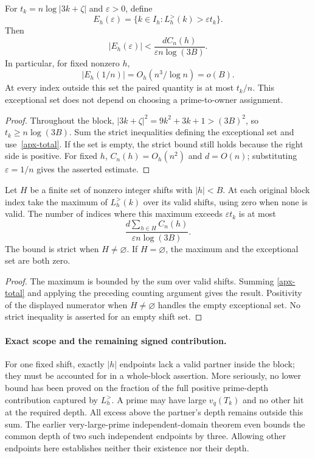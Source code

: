 \begin{corollary}
\label{apx-exceptional}
For \(t_k=n\log|3k+\zeta|\) and \(\varepsilon>0\), define
\[
 E_h(\varepsilon)=\{k\in I_h:L_h^{>}(k)>\varepsilon t_k\}.
\]
Then
\begin{equation}
 |E_h(\varepsilon)|<
       \frac{dC_n(h)}{\varepsilon n\log(3B)}.
 \label{apx-markov}
\end{equation}
In particular, for fixed nonzero \(h\),
\[
 |E_h(1/n)|=O_h(n^3/\log n)=o(B).
\]
At every index outside this set the paired quantity is at most
\(t_k/n\). This exceptional set does not depend on choosing a
prime-to-owner assignment.
\end{corollary}
\begin{proof}
Throughout the block,
\(|3k+\zeta|^2=9k^2+3k+1>(3B)^2\), so
\(t_k\ge n\log(3B)\). Sum the strict inequalities defining the
exceptional set and use~\eqref{apx-total}. If the set is empty,
the strict bound still holds because the right side is positive.
For fixed \(h\), \(C_n(h)=O_h(n^2)\) and \(d=O(n)\);
substituting \(\varepsilon=1/n\) gives the asserted estimate.
\end{proof}

\begin{corollary}
\label{apx-finite-shifts}
Let \(H\) be a finite set of nonzero integer shifts with \(|h|<B\).
At each original block index take the maximum of \(L_h^{>}(k)\)
over its valid shifts, using zero when none is valid. The number of
indices where this maximum exceeds \(\varepsilon t_k\) is at most
\[
 \frac{d\sum_{h\in H}C_n(h)}{\varepsilon n\log(3B)}.
\]
The bound is strict when \(H\ne\varnothing\). If \(H=\varnothing\),
the maximum and the exceptional set are both zero.
\end{corollary}
\begin{proof}
The maximum is bounded by the sum over valid shifts. Summing
\eqref{apx-total} and applying the preceding counting argument gives
the result. Positivity of the displayed numerator when \(H\ne
\varnothing\) handles the empty exceptional set. No strict inequality
is asserted for an empty shift set.
\end{proof}

\paragraph{Exact scope and the remaining signed contribution.}
For one fixed shift, exactly \(|h|\) endpoints lack a valid partner
inside the block; they must be accounted for in a whole-block assertion.
More seriously, no lower bound has been proved on the fraction of the
full positive prime-depth contribution captured by \(L_h^{>}\).
A prime may have large \(v_q(T_k)\) and no other hit at the required
depth. All excess above the partner's depth remains outside this sum.
The earlier very-large-prime independent-domain theorem even bounds
the common depth of two such independent endpoints by three. Allowing
other endpoints here establishes neither their existence nor their depth.

